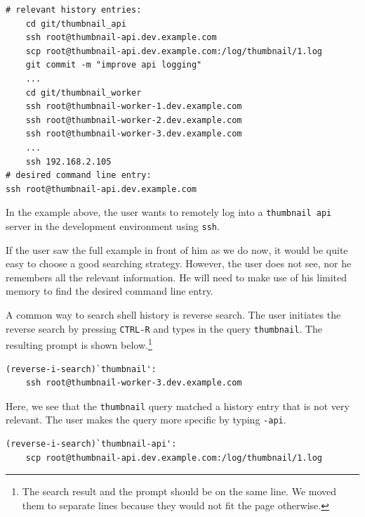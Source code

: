 

\begin{verbatim}
# relevant history entries:
    cd git/thumbnail_api
    ssh root@thumbnail-api.dev.example.com
    scp root@thumbnail-api.dev.example.com:/log/thumbnail/1.log
    git commit -m "improve api logging"
    ...
    cd git/thumbnail_worker
    ssh root@thumbnail-worker-1.dev.example.com
    ssh root@thumbnail-worker-2.dev.example.com
    ssh root@thumbnail-worker-3.dev.example.com
    ...
    ssh 192.168.2.105
# desired command line entry:
ssh root@thumbnail-api.dev.example.com
\end{verbatim}

In the example above, the user wants to remotely log into a \verb|thumbnail api| server in the development environment using \verb|ssh|. 

If the user saw the full example in front of him as we do now, it would be quite easy to choose a good searching strategy. However, the user does not see, nor he remembers all the relevant information. He will need to make use of his limited memory to find the desired command line entry. 

A common way to search shell history is reverse search. The user initiates the reverse search by pressing \verb|CTRL-R| and types in the query \verb|thumbnail|. The resulting prompt is shown below.\footnote{The search result and the prompt should be on the same line. We moved them to separate lines because they would not fit the page otherwise.}

\begin{verbatim}
(reverse-i-search)`thumbnail': 
    ssh root@thumbnail-worker-3.dev.example.com
\end{verbatim}

Here, we see that the \verb|thumbnail| query matched a history entry that is not very relevant. The user makes the query more specific by typing \verb|-api|.

\begin{verbatim}
(reverse-i-search)`thumbnail-api': 
    scp root@thumbnail-api.dev.example.com:/log/thumbnail/1.log
\end{verbatim}


